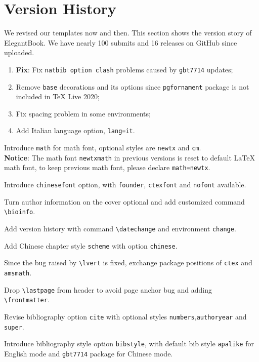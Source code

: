 \documentclass[11pt,fancy,authoryear]{elegantbook}
\begin{document}
\chapter{Version History}
We revised our templates now and then. This section shows the version story of ElegantBook. We have nearly 100 submits and 16 releases on GitHub since uploaded.


\begin{enumerate}
  \item \textbf{Fix}: Fix \lstinline{natbib option clash} problems caused by \lstinline{gbt7714} updates;
  \item Remove \lstinline{base} decorations and its options since \lstinline{pgfornament} package is not included in \TeX{} Live 2020;
  \item Fix spacing problem in some environments;
  \item Add Italian language option, \lstinline{lang=it}.
\end{enumerate}



\begin{change}
  \item Introduce \lstinline{math} for math font, optional styles are \lstinline{newtx} and \lstinline{cm}.\\
  \textbf{Notice}: The math font \lstinline{newtxmath} in previous versions is reset to default \LaTeX{} math font, to keep previous math font, please declare \lstinline{math=newtx}.
  \item Introduce \lstinline{chinesefont} option, with \lstinline{founder}, \lstinline{ctexfont} and \lstinline{nofont} available.
  \item Turn author information on the cover optional and add customized command \lstinline{\bioinfo}.
  \item Add version history with command \lstinline{\datechange} and environment \lstinline{change}.
  \item Add Chinese chapter style \lstinline{scheme} with option \lstinline{chinese}.
  \item Since the bug raised by \lstinline{\lvert} is fixed, exchange package positions of \lstinline{ctex} and \lstinline{amsmath}.
  \item Drop \lstinline{\lastpage} from header to avoid page anchor bug and adding \lstinline{\frontmatter}.
  \item Revise bibliography option \lstinline{cite} with optional styles \lstinline{numbers},\lstinline{authoryear} and \lstinline{super}.
  \item Introduce bibliography style option \lstinline{bibstyle}, with default bib style \lstinline{apalike} for English mode and \lstinline{gbt7714} package for Chinese mode.
\end{change}
\end{document}
